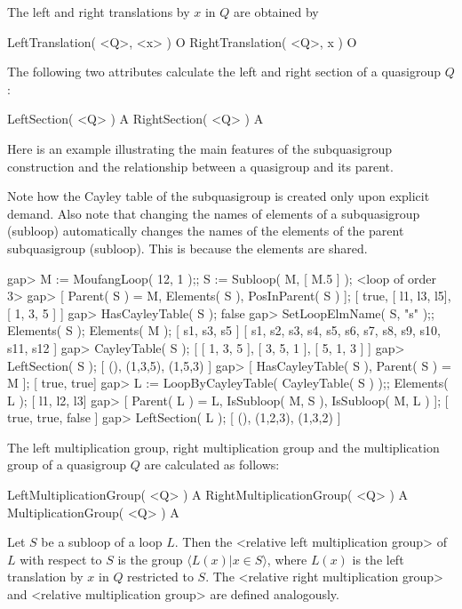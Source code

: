 The left and right translations by $x$ in $Q$ are obtained by

\>LeftTranslation( <Q>, <x> ) O
\>RightTranslation( <Q>, x ) O

The following two attributes calculate the left and right section of a
quasigroup $Q$:

\>LeftSection( <Q> ) A
\>RightSection( <Q> ) A

Here is an example illustrating the main features of the subquasigroup
construction and the relationship between a quasigroup and its parent.

Note how the Cayley table of the subquasigroup is created only upon explicit
demand. Also note that changing the names of elements of a subquasigroup
(subloop) automatically changes the names of the elements of the parent
subquasigroup (subloop). This is because the elements are shared.

\beginexample
gap> M := MoufangLoop( 12, 1 );; S := Subloop( M, [ M.5 ] );
<loop of order 3>
gap> [ Parent( S ) = M, Elements( S ), PosInParent( S ) ];
[ true, [ l1, l3, l5], [ 1, 3, 5 ] ]
gap> HasCayleyTable( S );
false
gap> SetLoopElmName( S, "s" );; Elements( S ); Elements( M );
[ s1, s3, s5 ]
[ s1, s2, s3, s4, s5, s6, s7, s8, s9, s10, s11, s12 ]
gap> CayleyTable( S );
[ [ 1, 3, 5 ], [ 3, 5, 1 ], [ 5, 1, 3 ] ]
gap> LeftSection( S );
[ (), (1,3,5), (1,5,3) ]
gap> [ HasCayleyTable( S ), Parent( S ) = M ];
[ true, true]
gap> L := LoopByCayleyTable( CayleyTable( S ) );; Elements( L );
[ l1, l2, l3]
gap> [ Parent( L ) = L, IsSubloop( M, S ), IsSubloop( M, L ) ];
[ true, true, false ]
gap> LeftSection( L );
[ (), (1,2,3), (1,3,2) ]
\endexample


The left multiplication group, right multiplication group and the
multiplication group of a quasigroup $Q$ are calculated as follows:

\>LeftMultiplicationGroup( <Q> ) A
\>RightMultiplicationGroup( <Q> ) A
\>MultiplicationGroup( <Q> ) A

Let $S$ be a subloop of a loop $L$. Then the <relative left multiplication group>
%
%
 of $L$ with respect to $S$ is the group $\langle L(x)|x\in S\rangle$, where
$L(x)$ is the left translation by $x$ in $Q$ restricted to $S$. The
<relative right multiplication group>
%
%
 and <relative multiplication group>
%
%
 are defined analogously.

